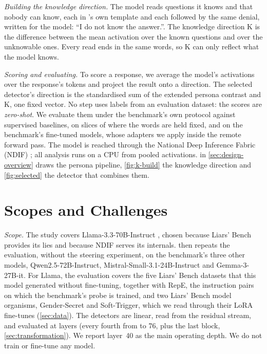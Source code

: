 \emph{Building the knowledge direction.} The model reads  questions it knows and
 that nobody can know, each in \hpkr's own template and each followed by the same
denial, written for the model: ``I do not know the answer.''. The knowledge direction K is the
difference between the mean activation over the known questions and over the unknowable ones. Every
read ends in the same words, so K can only reflect what the model knows.

\emph{Scoring and evaluating.} To score a response, we average the model's activations over the
response's tokens and project the result onto a direction. The selected detector's direction is the
standardised sum of the extended persona contrast and K, one fixed vector. No step uses labels from an
evaluation dataset: the scores are \emph{zero-shot}. We
evaluate them under the benchmark's own protocol against supervised baselines, on slices of \hpkr{}
where the words are held fixed, and on the benchmark's fine-tuned models, whose adapters we apply
inside the remote forward pass. The model is reached through the National Deep Inference Fabric
(NDIF) \cite{fiottokaufman2024nnsight}; all analysis runs on a CPU from pooled activations.
 in \cref{sec:design-overview} draws the persona pipeline, \cref{fig:k-build}
the knowledge direction and \cref{fig:selected} the detector that combines them.

\section{Scopes and Challenges}
\label{sec:scope}

\emph{Scope.} The study covers Llama-3.3-70B-Instruct \cite{meta2024llama33}, chosen because Liars'
Bench provides its lies and because NDIF serves its internals.  then repeats the
evaluation, without the steering experiment, on the benchmark's three other models,
Qwen2.5-72B-Instruct, Mistral-Small-3.1-24B-Instruct and Gemma-3-27B-it. For Llama, the evaluation covers
the five Liars' Bench datasets that this model generated without fine-tuning, together with RepE, the
instruction pairs on which the benchmark's probe is trained, and two Liars' Bench model organisms,
Gender-Secret and Soft-Trigger, which we read through their LoRA fine-tunes (\cref{sec:data}). The
detectors are linear, read from the residual stream, and evaluated at  layers (every
fourth from  to 76, plus the last block, \cref{sec:transformation}). We report layer~40
as the main operating depth. We do not train or fine-tune any model.

